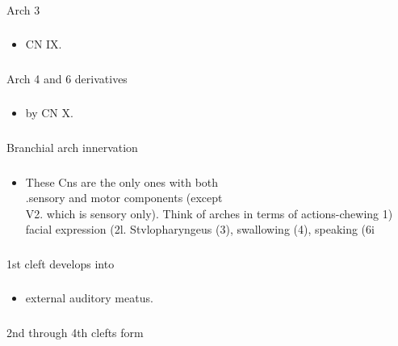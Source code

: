 \documentclass[11pt]{beamer}
\begin{document}
\begin{frame}
 \frametitle{}
Arch 3
\end{frame}

\begin{frame}
 \frametitle{}
\begin{itemize}
\item{CN IX. }
\end{itemize}
\end{frame}

\begin{frame}
 \frametitle{}
Arch 4 and 6 derivatives
\end{frame}

\begin{frame}
 \frametitle{}
\begin{itemize}
\item{by CN X.}
\end{itemize}
\end{frame}

\begin{frame}
 \frametitle{}
Branchial arch innervation
\end{frame}

\begin{frame}
 \frametitle{}
\begin{itemize}
\item{These Cns are the only ones with both \\ .sensory and motor components (except \\ V2. which is sensory only). Think of arches in terms of actions-chewing {1) \\ facial expression (2l. Stvlopharyngeus (3), swallowing (4), speaking (6}i}
\end{itemize}
\end{frame}

\begin{frame}
 \frametitle{}
1st cleft develops into
\end{frame}

\begin{frame}
 \frametitle{}
\begin{itemize}
\item{external auditory meatus.}
\end{itemize}
\end{frame}

\begin{frame}
 \frametitle{}
2nd through 4th clefts form 
\end{frame}
\end{document}
